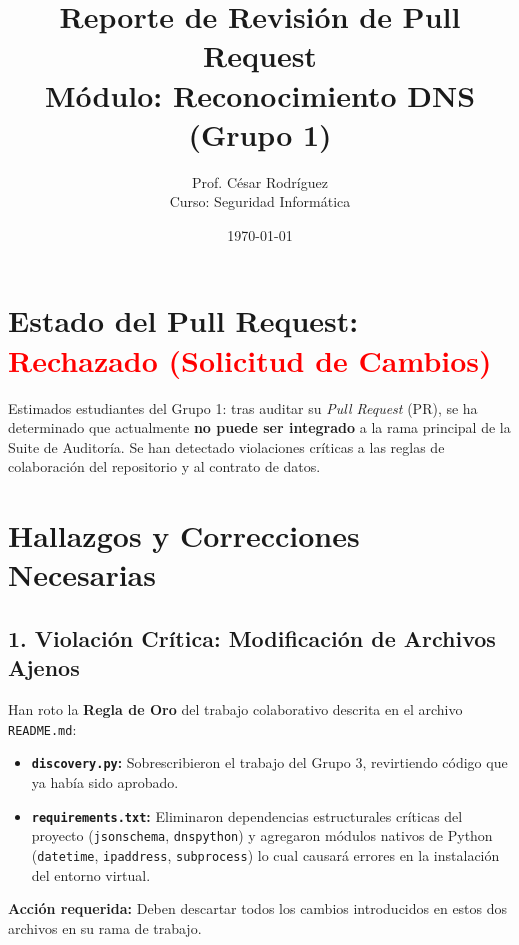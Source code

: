 \documentclass[12pt,a4paper]{article}
\title{Reporte de Revisión de Pull Request \\ \large Módulo: Reconocimiento DNS (Grupo 1)}
\author{Prof. César Rodríguez \\ \small Curso: Seguridad Informática}
\date{\today}
\begin{document}
\maketitle

\section*{Estado del Pull Request: \textcolor{red}{Rechazado (Solicitud de Cambios)}}

Estimados estudiantes del Grupo 1: tras auditar su \textit{Pull Request} (PR), se ha determinado que actualmente \textbf{no puede ser integrado} a la rama principal de la Suite de Auditoría. Se han detectado violaciones críticas a las reglas de colaboración del repositorio y al contrato de datos.

\section*{Hallazgos y Correcciones Necesarias}

\subsection*{1. Violación Crítica: Modificación de Archivos Ajenos}
Han roto la \textbf{Regla de Oro} del trabajo colaborativo descrita en el archivo \texttt{README.md}:
\begin{itemize}[label=$\bullet$]
    \item \textbf{\texttt{discovery.py}:} Sobrescribieron el trabajo del Grupo 3, revirtiendo código que ya había sido aprobado.
    \item \textbf{\texttt{requirements.txt}:} Eliminaron dependencias estructurales críticas del proyecto (\texttt{jsonschema}, \texttt{dnspython}) y agregaron módulos nativos de Python (\texttt{datetime}, \texttt{ipaddress}, \texttt{subprocess}) lo cual causará errores en la instalación del entorno virtual.
\end{itemize}
\textbf{Acción requerida:} Deben descartar todos los cambios introducidos en estos dos archivos en su rama de trabajo.
\end{document}
